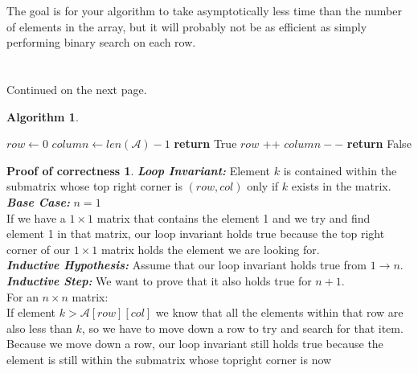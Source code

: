 \documentclass[11pt]{article}
\theoremstyle{definition}
\newtheorem*{algorithm}{Algorithm}
\newtheorem*{proofoc}{Proof of correctness}
\begin{document}
\begin{enumerate}
The goal is for your algorithm to take asymptotically less time than the number of elements 
in the array,  but it will probably not be as efficient as simply performing binary search on each row.
\\
\\
\\
Continued on the next page.
\newpage
\begin{algorithm}
    \item 
    \begin{algorithmic}[1]
         
        \State $row \gets 0$
        \State $column \gets len(\mathcal{A})-1$
                \State \textbf{return} True
                \State $row$ ++
            \Else 
                \State $column --$
            \EndIf
        \EndWhile
        \State \textbf{return} False
        \EndProcedure
    \end{algorithmic}
\end{algorithm}
\newpage
\begin{proofoc}
    \item 
    \textbf{\textit{Loop Invariant:} }Element $k$ is contained within the submatrix whose top right corner is $(row, col)$ only if $k$ exists in the matrix. \\[0.7em]
    \textbf{\textit{Base Case: }}$n=1$\\
    If we have a $1\times1$ matrix that contains the element 1 and we try and find element 1 in that matrix, our loop invariant holds true because 
    the top right corner of our $1 \times 1$ matrix holds the element we are looking for. \\[0.7em]
    \textbf{\textit{Inductive Hypothesis: }}Assume that our loop invariant holds true from $1 \rightarrow n$.\\[0.7em]
    \textbf{\textit{Inductive Step: }}We want to prove that it also holds true for $n+1$.\\
    For an $n \times n$ matrix: \\
    If element $k > \mathcal{A}[row][col]$ we know that all the elements within that row are also less than $k$, so we have to move 
    down a row to try and search for that item. Because we move down a row, our loop invariant still holds true because the element is still within the submatrix whose topright corner is now 

\end{proofoc}
\end{enumerate}
\end{document}
